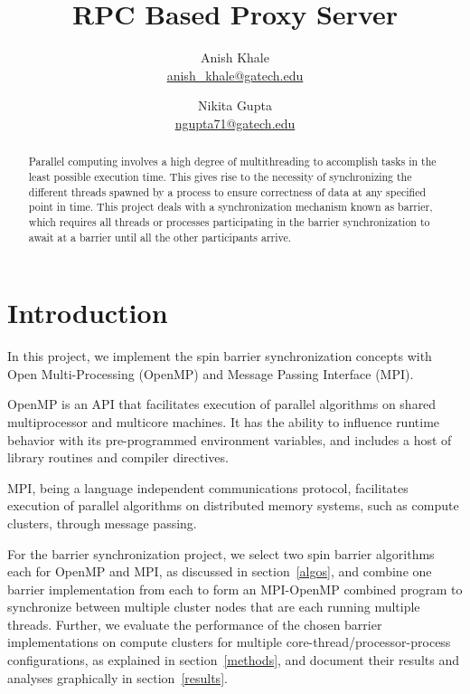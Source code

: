 \documentclass[11pt,pdftex,twocolumn]{article}
\title{RPC Based Proxy Server}
\author{
Anish Khale\\
\url{anish_khale@gatech.edu}
\and
Nikita Gupta\\
\url{ngupta71@gatech.edu}
}
\date{}
\begin{document}
\maketitle
\fancyfoot{}
\fancyfoot[C]{\thepage}
\thispagestyle{fancy}

\begin{abstract}
Parallel computing involves a high degree of multithreading to accomplish tasks in the least possible execution time. This gives rise to the necessity of synchronizing the different threads spawned by a process to ensure correctness of data at any specified point in time. This project deals with a synchronization mechanism known as barrier, which requires all threads or processes participating in the barrier synchronization to await at a barrier until all the other participants arrive.
\end{abstract}

\section{Introduction}
In this project, we implement the spin barrier synchronization concepts with Open Multi-Processing (OpenMP) and Message Passing Interface (MPI).

OpenMP is an API that facilitates execution of parallel algorithms on shared multiprocessor and multicore machines. It has the ability to influence runtime behavior with its pre-programmed environment variables, and includes a host of library routines and compiler directives.

MPI, being a language independent communications protocol, facilitates execution of parallel algorithms on distributed memory systems, such as compute clusters, through message passing.

For the barrier synchronization project, we select two spin barrier algorithms each for OpenMP and MPI, as discussed in section~\ref{algos}, and combine one barrier implementation from each to form an MPI-OpenMP combined program to synchronize between multiple cluster nodes that are each running multiple threads. Further, we evaluate the performance of the chosen barrier implementations on compute clusters for multiple core-thread/processor-process configurations, as explained in section~\ref{methods}, and document their results and analyses graphically in section~\ref{results}.
\end{document}
